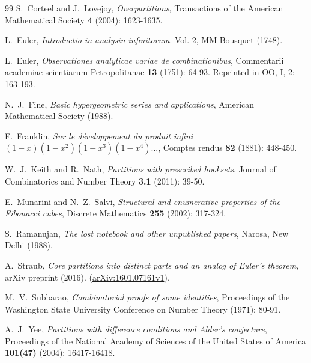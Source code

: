 \documentclass[12pt]{amsart}
\numberwithin{equation}{section}
\theoremstyle{plain}
\theoremstyle{definition}
\begin{document}
\begin{thebibliography}{99}
S.~Corteel and J.~Lovejoy, \emph{Overpartitions}, Transactions of the American Mathematical Society {\bf 4} (2004): 1623-1635.

L.~Euler, \emph{Introductio in analysin infinitorum}. Vol. 2, MM Bousquet (1748).

L.~Euler, \emph{Observationes analyticae variae de combinationibus}, Commentarii academiae scientiarum Petropolitanae {\bf 13} (1751): 64-93. Reprinted in OO, I, 2: 163-193.

N.~J.~Fine, \emph{Basic hypergeometric series and applications}, American Mathematical Society (1988).

F.~Franklin, \emph{Sur le d\'{e}veloppement du produit infini $(1-x)(1-x^2)(1-x^3)(1-x^4)...$}, Comptes rendus {\bf 82} (1881): 448-450.

W.~J.~Keith and R.~Nath, \emph{Partitions with prescribed hooksets}, Journal of Combinatorics and Number Theory {\bf 3.1} (2011): 39-50.

E.~Munarini and N.~Z.~Salvi, \emph{Structural and enumerative properties of the Fibonacci cubes}, Discrete Mathematics {\bf 255} (2002): 317-324.



S.~Ramanujan, \emph{The lost notebook and other unpublished papers}, Narosa, New Delhi (1988).

A.~Straub, \emph{Core partitions into distinct parts and an analog of Euler's theorem}, arXiv preprint (2016). (\href{http://arxiv.org/abs/1601.07161v1}{arXiv:1601.07161v1}).

M.~V.~Subbarao, \emph{Combinatorial proofs of some identities}, Proceedings of the Washington State University Conference on Number Theory (1971): 80-91.



A.~J.~Yee, \emph{Partitions with difference conditions and Alder's conjecture}, Proceedings of the National Academy of Sciences of the United States of America {\bf 101(47)} (2004): 16417-16418.

\end{thebibliography}
\end{document}
